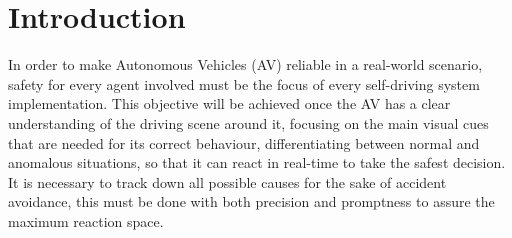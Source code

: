 \section{Introduction}

In order to make Autonomous Vehicles (AV) reliable in a real-world scenario, safety for every agent involved must be the focus of every self-driving system implementation.
This objective will be achieved once the AV has a clear understanding of the driving scene around it, focusing on the main visual cues that are needed for its correct behaviour, differentiating between normal and anomalous situations, so that it can react in real-time to take the safest decision.
It is necessary to track down all possible causes for the sake of accident avoidance, this must be done with both precision and promptness to assure the maximum reaction space.

